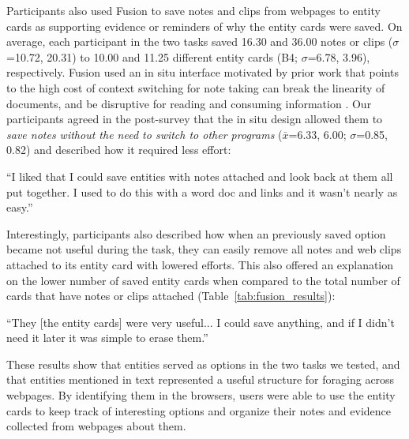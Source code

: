 Participants also used Fusion to save notes and clips from webpages to entity cards as supporting evidence or reminders of why the entity cards were saved.
On average, each participant in the two tasks saved 16.30 and 36.00 notes or clips ($\sigma$=10.72, 20.31) to 10.00 and 11.25 different entity cards (B4; $\sigma$=6.78, 3.96), respectively. Fusion used an in situ interface motivated by prior work that points to the high cost of context switching for note taking can break the linearity of documents, and be disruptive for reading and consuming information \cite{o1996towards,tashman2011liquidtext}.
Our participants agreed in the post-survey that the in situ design allowed them to \emph{save notes without the need to switch to other programs} ($\bar{x}$=6.33, 6.00; $\sigma$=0.85, 0.82) and described how it required less effort:

\begin{tightquote}
``I liked that I could save entities with notes attached and look back at them all put together. I used to do this with a word doc and links and it wasn't nearly as easy.''
\end{tightquote}

\noindent Interestingly, participants also described how when an previously saved option became not useful during the task, they can easily remove all notes and web clips attached to its entity card with lowered efforts. This also offered an explanation on the lower number of saved entity cards when compared to the total number of cards that have notes or clips attached (Table~\ref{tab:fusion_results}):

\begin{tightquote}
``They [the entity cards] were very useful... I could save anything, and if I didn't need it later it was simple to erase them.''
\end{tightquote}

\noindent These results show that entities served as options in the two tasks we tested, and that entities mentioned in text represented a useful structure for foraging across webpages. By identifying them in the browsers, users were able to use the entity cards to keep track of interesting options and organize their notes and evidence collected from webpages about them.




